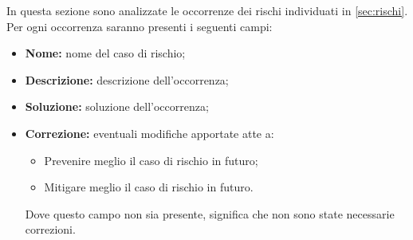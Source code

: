 In questa sezione sono analizzate le occorrenze dei rischi individuati in \cref{sec:rischi}. Per ogni occorrenza saranno presenti i seguenti campi:
\begin{itemize}
	\item \textbf{Nome: }nome del caso di rischio;
	\item \textbf{Descrizione: }descrizione dell'occorrenza;
	\item \textbf{Soluzione: }soluzione dell'occorrenza;
	\item \textbf{Correzione: }eventuali modifiche apportate atte a:
			\begin{itemize}
				\item Prevenire meglio il caso di rischio in futuro;
				\item Mitigare meglio il caso di rischio in futuro.
			\end{itemize}
			Dove questo campo non sia presente, significa che non sono state necessarie correzioni.
\end{itemize}
